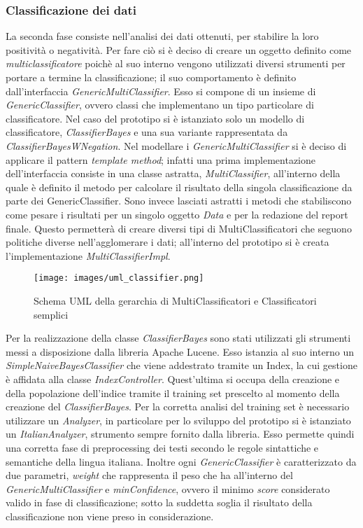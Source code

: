 \subsubsection{Classificazione dei dati}
La seconda fase consiste nell'analisi dei dati ottenuti, per stabilire la loro positività o negatività. Per fare ciò si è deciso di creare un oggetto definito come \textit{multiclassificatore} poichè al suo interno vengono utilizzati diversi strumenti per portare a termine la classificazione; il suo comportamento è definito dall'interfaccia \textit{GenericMultiClassifier}. Esso si compone di un insieme di \textit{GenericClassifier}, ovvero classi che implementano un tipo particolare di classificatore. Nel caso del prototipo si è istanziato solo un modello di classificatore, \textit{ClassifierBayes} e una sua variante rappresentata da \textit{ClassifierBayesWNegation}. Nel modellare i \textit{GenericMultiClassifier} si è deciso di applicare il pattern \textit{template method}; infatti una prima implementazione dell'interfaccia consiste in una classe astratta, \textit{MultiClassifier}, all'interno della quale è definito il metodo per calcolare il risultato della singola classificazione da parte dei GenericClassifier. Sono invece lasciati astratti i metodi che stabiliscono come pesare i risultati per un singolo oggetto \textit{Data} e per la redazione del report finale. Questo permetterà di creare diversi tipi di MultiClassificatori che seguono politiche diverse nell'agglomerare i dati; all'interno del prototipo si è creata l'implementazione \textit{MultiClassifierImpl}. 
\begin{figure}[h]
    \centering
    \texttt{[image: images/uml\_classifier.png]}
    \caption{Schema UML della gerarchia di MultiClassificatori e Classificatori semplici}
    \label{fig:uml_classifier}
\end{figure} 

Per la realizzazione della classe \textit{ClassifierBayes} sono stati utilizzati gli strumenti messi a disposizione dalla libreria Apache Lucene. Esso istanzia al suo interno un \textit{SimpleNaiveBayesClassifier} che viene addestrato tramite un Index, la cui gestione è affidata alla classe \textit{IndexController}. Quest'ultima si occupa della creazione e della popolazione dell'indice tramite il training set prescelto al momento della creazione del \textit{ClassifierBayes}. Per la corretta analisi del training set è necessario utilizzare un \textit{Analyzer}, in particolare per lo sviluppo del prototipo si è istanziato un \textit{ItalianAnalyzer}, strumento sempre fornito dalla libreria. Esso permette quindi una corretta fase di preprocessing dei testi secondo le regole sintattiche e semantiche della lingua italiana. Inoltre ogni \textit{GenericClassifier} è caratterizzato da due parametri, \textit{weight} che rappresenta il peso che ha all'interno del \textit{GenericMultiClassifier} e \textit{minConfidence}, ovvero il minimo \textit{score} considerato valido in fase di classificazione; sotto la suddetta soglia il risultato della classificazione non viene preso in considerazione. 

